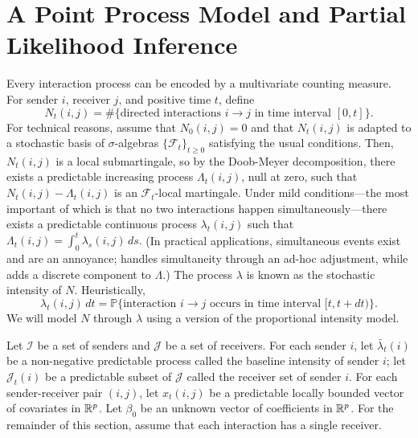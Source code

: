 \documentclass[final]{statsoc}
\begin{document}
\section{A Point Process Model and Partial Likelihood Inference}
\label{S:point-process-model}

Every interaction process can be encoded by a multivariate counting measure.
For sender $i$, receiver $j$, and positive time $t$, define
\[
    N_t(i,j)
        =
        \#\{
            \text{directed interactions $i\rightarrow j$ in time interval
            $[0,t]$}
        \}.
\]
For technical reasons, assume that $N_0(i,j) = 0$ and that $N_t(i,j)$ is
adapted to a stochastic basis of $\sigma$-algebras
$\{ \mathcal{F}_t \}_{t \geq 0}$ satisfying the usual conditions.  Then,
$N_t(i,j)$ is a local submartingale, so by the Doob-Meyer decomposition,
there exists a predictable increasing process $\Lambda_t(i,j)$, null at
zero, such that $N_t(i,j) - \Lambda_t(i,j)$ is an $\mathcal{F}_t$-local
martingale.  Under mild conditions---the most important of which is that
no two interactions happen simultaneously---there exists a predictable
continuous process $\lambda_t(i,j)$ such that
\(
    \Lambda_t(i,j) = \int_0^t \lambda_s(i,j) \, ds.
\)
(In practical applications, simultaneous events exist and are an annoyance;
\citet{efron1977efficiency} handles simultaneity through an ad-hoc
adjustment, while \citet{brostrom2002cox} adds a discrete component
to $\Lambda$.)  The process $\lambda$ is known as the stochastic intensity
of $N$.  Heuristically,
\[
    \lambda_t(i,j) \, dt
        =
        \mathbb{P}\{
            \text{interaction $i\rightarrow j$ occurs in time interval $[t,t+dt)$}
        \}.
\]
We will model $N$ through $\lambda$ using a version of the \citet{cox1972regression}
proportional intensity model.

Let $\mathcal{I}$ be a set of senders and $\mathcal{J}$ be a set of receivers.
For each sender $i$, let $\bar \lambda_t(i)$ be a non-negative predictable
process called the baseline intensity of sender $i$; let $\mathcal{J}_t(i)$ be
a predictable subset of $\mathcal{J}$ called the receiver set of sender $i$.
For each sender-receiver pair $(i,j)$, let $x_t(i,j)$ be a predictable
locally bounded vector of covariates in $\mathbb{R}^p$.  Let $\beta_0$
be an unknown vector of coefficients in  $\mathbb{R}^p$.  For the remainder of 
this section, assume that each interaction has a single receiver.
\end{document}
